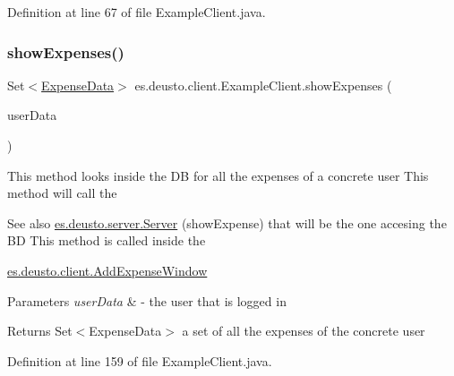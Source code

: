 Definition at line 67 of file Example\+Client.\+java.

\mbox{\label{classes_1_1deusto_1_1client_1_1_example_client_a527d2790290c153cae5b16133a38269a}} 
\subsubsection{\texorpdfstring{show\+Expenses()}{showExpenses()}}
{\footnotesize\ttfamily Set$<$\hyperlink{classes_1_1deusto_1_1serialization_1_1_expense_data}{Expense\+Data}$>$ es.\+deusto.\+client.\+Example\+Client.\+show\+Expenses (\begin{DoxyParamCaption}\item[{\hyperlink{classes_1_1deusto_1_1serialization_1_1_user_data}{User\+Data}}]{user\+Data }\end{DoxyParamCaption})}

This method looks inside the DB for all the expenses of a concrete user This method will call the \begin{DoxySeeAlso}{See also}
\hyperlink{classes_1_1deusto_1_1server_1_1_server}{es.\+deusto.\+server.\+Server} (show\+Expense) that will be the one accesing the BD This method is called inside the 

\hyperlink{classes_1_1deusto_1_1client_1_1_add_expense_window}{es.\+deusto.\+client.\+Add\+Expense\+Window} 
\end{DoxySeeAlso}

\begin{DoxyParams}{Parameters}
{\em user\+Data} & -\/ the user that is logged in \\
\hline
\end{DoxyParams}
\begin{DoxyReturn}{Returns}
Set$<$\+Expense\+Data$>$ a set of all the expenses of the concrete user 
\end{DoxyReturn}


Definition at line 159 of file Example\+Client.\+java.

\mbox{\label{classes_1_1deusto_1_1client_1_1_example_client_aba5fe3dfb882ef22d0bd49b5915871d3}} 
